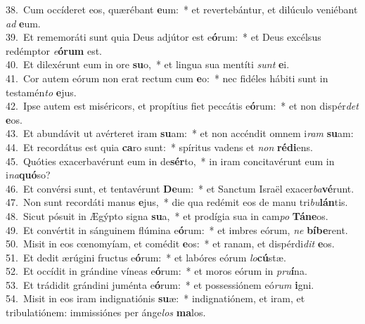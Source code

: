 {38.~}Cum occíderet eos, quærébant \textbf{e}um:~* et revertebántur, et dilúculo veniébant \textit{ad} \textbf{e}um.\\
{39.~}Et rememoráti sunt quia Deus adjútor est e\textbf{ó}rum:~* et Deus excélsus redémptor \textit{e}\textbf{ó}\textbf{rum} est.\\
{40.~}Et dilexérunt eum in ore \textbf{su}o,~* et lingua sua mentíti \textit{sunt} \textbf{e}i.\\
{41.~}Cor autem eórum non erat rectum cum \textbf{e}o:~* nec fidéles hábiti sunt in testamén\textit{to} \textbf{e}jus.\\
{42.~}Ipse autem est miséricors, et propítius fiet peccátis e\textbf{ó}rum:~* et non dispér\textit{det} \textbf{e}os.\\
{43.~}Et abundávit ut avérteret iram \textbf{su}am:~* et non accéndit omnem i\textit{ram} \textbf{su}am:\\
{44.~}Et recordátus est quia \textbf{ca}ro sunt:~* spíritus vadens et \textit{non} \textbf{ré}\textbf{di}ens.\\
{45.~}Quóties exacerbavérunt eum in de\textbf{sér}to,~* in iram concitavérunt eum in i\textit{na}\textbf{quó}so?\\
{46.~}Et convérsi sunt, et tentavérunt \textbf{De}um:~* et Sanctum Israël exacer\textit{ba}\textbf{vé}runt.\\
{47.~}Non sunt recordáti manus \textbf{e}jus,~* die qua redémit eos de manu tri\textit{bu}\textbf{lán}tis.\\
{48.~}Sicut pósuit in Ægýpto signa \textbf{su}a,~* et prodígia sua in cam\textit{po} \textbf{Tá}\textbf{ne}os.\\
{49.~}Et convértit in sánguinem flúmina e\textbf{ó}rum:~* et imbres eórum, \textit{ne} \textbf{bí}\textbf{be}rent.\\
{50.~}Misit in eos cœnomyíam, et comédit \textbf{e}os:~* et ranam, et dispérdi\textit{dit} \textbf{e}os.\\
{51.~}Et dedit ærúgini fructus e\textbf{ó}rum:~* et labóres eórum \textit{lo}\textbf{cú}stæ.\\
{52.~}Et occídit in grándine víneas e\textbf{ó}rum:~* et moros eórum in \textit{pru}\textbf{í}na.\\
{53.~}Et trádidit grándini juménta e\textbf{ó}rum:~* et possessiónem eó\textit{rum} \textbf{i}gni.\\
{54.~}Misit in eos iram indignatiónis \textbf{su}æ:~* indignatiónem, et iram, et tribulatiónem: immissiónes per ánge\textit{los} \textbf{ma}los.\\
